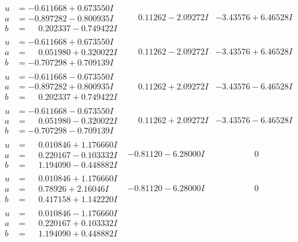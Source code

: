 \documentclass[1p]{elsarticle_modified}
\theoremstyle{definition}
\begin{document}
$$\begin{array}{c|c|c}
\begin{aligned}
u &= -0.611668 + 0.673550 I \\
a &= -0.897282 - 0.800935 I \\
b &= \phantom{-}0.202337 - 0.749422 I\end{aligned}
 & \phantom{-}0.11262 - 2.09272 I & -3.43576 + 6.46528 I \\ \hline\begin{aligned}
u &= -0.611668 + 0.673550 I \\
a &= \phantom{-}0.051980 + 0.320022 I \\
b &= -0.707298 + 0.709139 I\end{aligned}
 & \phantom{-}0.11262 - 2.09272 I & -3.43576 + 6.46528 I \\ \hline\begin{aligned}
u &= -0.611668 - 0.673550 I \\
a &= -0.897282 + 0.800935 I \\
b &= \phantom{-}0.202337 + 0.749422 I\end{aligned}
 & \phantom{-}0.11262 + 2.09272 I & -3.43576 - 6.46528 I \\ \hline\begin{aligned}
u &= -0.611668 - 0.673550 I \\
a &= \phantom{-}0.051980 - 0.320022 I \\
b &= -0.707298 - 0.709139 I\end{aligned}
 & \phantom{-}0.11262 + 2.09272 I & -3.43576 - 6.46528 I \\ \hline\begin{aligned}
u &= \phantom{-}0.010846 + 1.176660 I \\
a &= \phantom{-}0.220167 - 0.103332 I \\
b &= \phantom{-}1.194090 - 0.448882 I\end{aligned}
 & -0.81120 - 6.28000 I & \phantom{-0.000000 } 0 \\ \hline\begin{aligned}
u &= \phantom{-}0.010846 + 1.176660 I \\
a &= \phantom{-}0.78926 + 2.16046 I \\
b &= \phantom{-}0.417158 + 1.142220 I\end{aligned}
 & -0.81120 - 6.28000 I & \phantom{-0.000000 } 0 \\ \hline\begin{aligned}
u &= \phantom{-}0.010846 - 1.176660 I \\
a &= \phantom{-}0.220167 + 0.103332 I \\
b &= \phantom{-}1.194090 + 0.448882 I\end{aligned}

\end{array}$$
\end{document}
